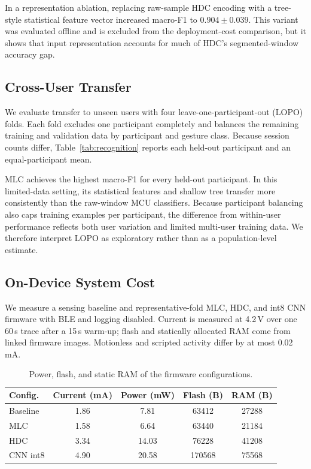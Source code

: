 In a representation ablation, replacing raw-sample HDC encoding with a
tree-style statistical feature vector increased macro-F1 to $0.904\pm0.039$.
This variant
was evaluated offline and is excluded from the deployment-cost comparison, but
it shows that input representation accounts for much of HDC's segmented-window
accuracy gap.

\subsection{Cross-User Transfer}

We evaluate transfer to unseen users with four leave-one-participant-out
(LOPO) folds. Each fold excludes one participant completely and balances the
remaining training and validation data by participant and gesture class.
Because session counts differ, Table~\ref{tab:recognition} reports each
held-out participant and an equal-participant mean.

MLC achieves the highest macro-F1 for every held-out participant. In this
limited-data setting, its statistical features and shallow tree transfer more
consistently than the raw-window MCU classifiers. Because participant
balancing also caps training examples per participant, the difference from
within-user performance reflects both user variation and limited multi-user
training data. We therefore interpret LOPO as exploratory rather than as a
population-level estimate.

\subsection{On-Device System Cost}

We measure a sensing baseline and representative-fold MLC, HDC, and int8 CNN
firmware with BLE and logging disabled. Current is measured at 4.2\,V over one
60\,s trace after a 15\,s warm-up; flash and statically allocated RAM come from
linked firmware images. Motionless and scripted activity differ by at most
0.02\,mA.

\begin{table}[t]
    \centering
    \caption{Power, flash, and static RAM of the firmware configurations.}
    \label{tab:system_cost}
    \small
    \begin{tabular}{
        l
        S[table-format=1.2]
        S[table-format=2.2]
        S[table-format=6.0, group-separator={,}]
        S[table-format=5.0, group-separator={,}]
    }
        \toprule
        {Config.} & {Current (mA)} & {Power (mW)} & {Flash (B)} & {RAM (B)} \\
        \midrule
        Baseline & 1.86 &  7.81 &  63412 & 27288 \\
        MLC      & 1.58 &  6.64 &  63440 & 21184 \\
        HDC      & 3.34 & 14.03 &  76228 & 41208 \\
        CNN int8 & 4.90 & 20.58 & 170568 & 75568 \\
        \bottomrule
    \end{tabular}
\end{table}

